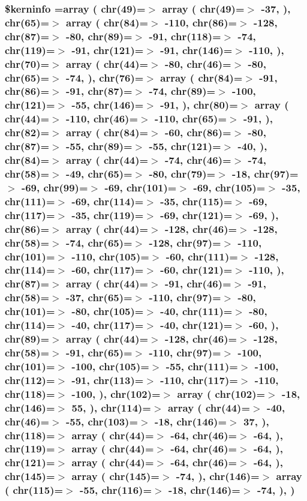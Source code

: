 \hypertarget{ctimes_8php_ab4bb7d3b0332c517f6a42a1924f01000}{
\subsubsection[{\$kerninfo}]{\setlength{\rightskip}{0pt plus 5cm}\$kerninfo =array ( chr(49)=$>$ array ( chr(49)=$>$ -\/37, ), chr(65)=$>$ array ( chr(84)=$>$ -\/110, chr(86)=$>$ -\/128, chr(87)=$>$ -\/80, chr(89)=$>$ -\/91, chr(118)=$>$ -\/74, chr(119)=$>$ -\/91, chr(121)=$>$ -\/91, chr(146)=$>$ -\/110, ), chr(70)=$>$ array ( chr(44)=$>$ -\/80, chr(46)=$>$ -\/80, chr(65)=$>$ -\/74, ), chr(76)=$>$ array ( chr(84)=$>$ -\/91, chr(86)=$>$ -\/91, chr(87)=$>$ -\/74, chr(89)=$>$ -\/100, chr(121)=$>$ -\/55, chr(146)=$>$ -\/91, ), chr(80)=$>$ array ( chr(44)=$>$ -\/110, chr(46)=$>$ -\/110, chr(65)=$>$ -\/91, ), chr(82)=$>$ array ( chr(84)=$>$ -\/60, chr(86)=$>$ -\/80, chr(87)=$>$ -\/55, chr(89)=$>$ -\/55, chr(121)=$>$ -\/40, ), chr(84)=$>$ array ( chr(44)=$>$ -\/74, chr(46)=$>$ -\/74, chr(58)=$>$ -\/49, chr(65)=$>$ -\/80, chr(79)=$>$ -\/18, chr(97)=$>$ -\/69, chr(99)=$>$ -\/69, chr(101)=$>$ -\/69, chr(105)=$>$ -\/35, chr(111)=$>$ -\/69, chr(114)=$>$ -\/35, chr(115)=$>$ -\/69, chr(117)=$>$ -\/35, chr(119)=$>$ -\/69, chr(121)=$>$ -\/69, ), chr(86)=$>$ array ( chr(44)=$>$ -\/128, chr(46)=$>$ -\/128, chr(58)=$>$ -\/74, chr(65)=$>$ -\/128, chr(97)=$>$ -\/110, chr(101)=$>$ -\/110, chr(105)=$>$ -\/60, chr(111)=$>$ -\/128, chr(114)=$>$ -\/60, chr(117)=$>$ -\/60, chr(121)=$>$ -\/110, ), chr(87)=$>$ array ( chr(44)=$>$ -\/91, chr(46)=$>$ -\/91, chr(58)=$>$ -\/37, chr(65)=$>$ -\/110, chr(97)=$>$ -\/80, chr(101)=$>$ -\/80, chr(105)=$>$ -\/40, chr(111)=$>$ -\/80, chr(114)=$>$ -\/40, chr(117)=$>$ -\/40, chr(121)=$>$ -\/60, ), chr(89)=$>$ array ( chr(44)=$>$ -\/128, chr(46)=$>$ -\/128, chr(58)=$>$ -\/91, chr(65)=$>$ -\/110, chr(97)=$>$ -\/100, chr(101)=$>$ -\/100, chr(105)=$>$ -\/55, chr(111)=$>$ -\/100, chr(112)=$>$ -\/91, chr(113)=$>$ -\/110, chr(117)=$>$ -\/110, chr(118)=$>$ -\/100, ), chr(102)=$>$ array ( chr(102)=$>$ -\/18, chr(146)=$>$ 55, ), chr(114)=$>$ array ( chr(44)=$>$ -\/40, chr(46)=$>$ -\/55, chr(103)=$>$ -\/18, chr(146)=$>$ 37, ), chr(118)=$>$ array ( chr(44)=$>$ -\/64, chr(46)=$>$ -\/64, ), chr(119)=$>$ array ( chr(44)=$>$ -\/64, chr(46)=$>$ -\/64, ), chr(121)=$>$ array ( chr(44)=$>$ -\/64, chr(46)=$>$ -\/64, ), chr(145)=$>$ array ( chr(145)=$>$ -\/74, ), chr(146)=$>$ array ( chr(115)=$>$ -\/55, chr(116)=$>$ -\/18, chr(146)=$>$ -\/74, ), )}}\label{ctimes_8php_ab4bb7d3b0332c517f6a42a1924f01000}


